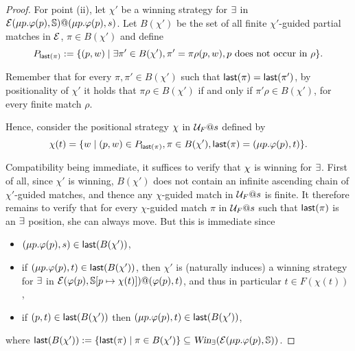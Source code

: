 \begin{proof}
For point (ii), let $\chi'$ be a winning strategy for $\exists$ in
$\mathcal{E}(\mu p.\varphi(p),\mathbb{S})@(\mu p.\varphi(p),s)$.  Let $B(\chi')$ be the set of all finite $\chi'$-guided partial matches in $\mathcal{E}$, $\pi\in B(\chi')$ and define \[P_{\last(\pi)}:=\{ (p,w) \mid \exists \pi' \in B(\chi'), \pi'=\pi \rho(p,w), p\text{ does not occur in }\rho\}.\]

Remember that for every $\pi, \pi' \in B(\chi')$ such that $\textsf{last}(\pi)=\textsf{last}(\pi')$,  by positionality of $\chi'$ it holds that $\pi\rho \in B(\chi')$ if and only if $\pi'\rho \in B(\chi')$, for every finite match $\rho$.

Hence, consider  the positional strategy $\chi$ in $\mathcal{U}_{F}@s$ 
defined by \[\chi(t)= \{ w \mid (p,w) \in P_{\textsf{last}(\pi)}, \pi\in B(\chi'), \textsf{last}(\pi)=(\mu p. \varphi(p), t)\}.\]



Compatibility being immediate, it suffices to verify that $\chi$ is winning for $\exists$. First of all, since $\chi'$ is winning, $B(\chi')$ does not contain an infinite 
ascending chain of $\chi'$-guided matches, and thence any  $\chi$-guided match in $\mathcal{U}_{F}@s$ is finite. It therefore remains to verify that for every $\chi$-guided match $\pi$ in $\mathcal{U}_{F}@s$ such that $\textsf{last}(\pi)$ is an $\exists$ position, she can always move. But this is immediate since 
\begin{itemize}
\item $(\mu p. \varphi(p), s) \in \textsf{last}(B(\chi'))$, 
\item if $(\mu p. \varphi(p), t) \in \textsf{last}(B(\chi'))$, then %
$\chi'$ is (naturally induces) a winning strategy for $\exists$ in $\mathcal{E}(\varphi(p),\mathbb{S}[p \mapsto \chi(t)])@(\varphi(p),t)$, and thus in particular $t \in F(\chi(t))$,
\item if $(p, t) \in \textsf{last}(B(\chi'))$ then $(\mu p. \varphi(p), t) \in \textsf{last}(B(\chi'))$,
\end{itemize}
where $\last(B(\chi')):=\{\last(\pi) \mid \pi \in B(\chi')\} \subseteq \win_{\eloise}(\egame(\mu p.\phi(p),\model))$.
\end{proof}


